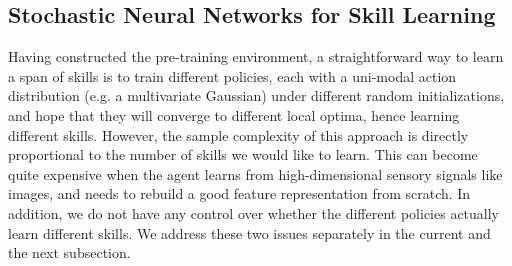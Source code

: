 \documentclass{article} %
\begin{document}


\subsection{Stochastic Neural Networks for Skill Learning}
\label{section:method:snn}

Having constructed the pre-training environment, a straightforward way to learn a span of skills is to train different policies, each with a uni-modal action distribution (e.g. a multivariate Gaussian) under different random initializations, and hope that they will converge to different local optima, hence learning different skills. However, the sample complexity of this approach is directly proportional to the number of skills we would like to learn. This can become quite expensive when the agent learns from high-dimensional sensory signals like images, and needs to rebuild a good feature representation from scratch. In addition, we do not have any control over whether the different policies actually learn different skills. We address these two issues separately in the current and the next subsection.%
\end{document}
